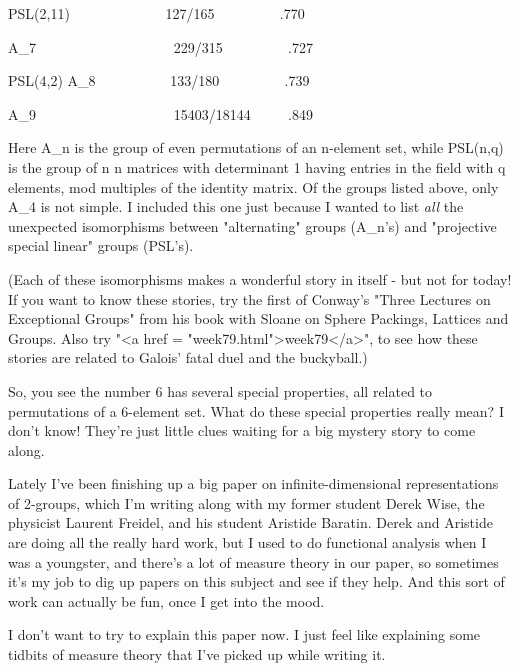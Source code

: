 PSL(2,11)      
\   \   \   \   \   \   \   
\   \   \   \   \   \                 
 127/165
\   \   \   \   \   \                 
\      ~ .770

A_{7} 
\   \   \  \   \   \   \   \   \   
\   \   \   \   \   
\   \   \   \   \   
                           229/315   
\   \   \   \   \  \   \   
    ~ .727 

PSL(4,2) \cong  A_{8}          
\   \   \  \   \   \   \   \   \   
\   
                   133/180   
\   \   \   \   \              
\   \   
  ~ .739

A_{9}
\   \   \   \   \   
\   \   \  
\   \   \  
\   \   \  
\   \   \  
\   \  
                15403/18144 
\   \    \                 
~ .849

Here A_{n} is the group of even permutations of an n-element set,
while PSL(n,q) is the group of n \times  n matrices with determinant 1
having entries in the field with q elements, mod multiples of the identity
matrix.  Of the groups listed above, only A_{4} is not simple.  I
included this one just because I wanted to list \emph{all} the unexpected
isomorphisms between "alternating" groups (A_{n}'s) and "projective
special linear" groups (PSL's).

(Each of these isomorphisms makes a wonderful story in 
itself - but not for today!  If you want to know these stories, 
try the first of Conway's "Three Lectures on Exceptional Groups" from his 
book with Sloane on Sphere Packings, Lattices and Groups.  Also try 
"<a href = "week79.html">week79</a>", to see how these stories
are related to Galois' fatal duel and the buckyball.) 

So, you see the number 6 has several special properties, all related to
permutations of a 6-element set.  What do these special properties
really mean?  I don't know!  They're just little clues waiting for a
big mystery story to come along.

Lately I've been finishing up a big paper on infinite-dimensional
representations of 2-groups, which I'm writing along with my former
student Derek Wise, the physicist Laurent Freidel, and his student
Aristide Baratin.  Derek and Aristide are doing all the really hard
work, but I used to do functional analysis when I was a youngster, 
and there's a lot of measure theory in our paper, so sometimes it's 
my job to dig up papers on this subject and see if they help.  And 
this sort of work can actually be fun, once I get into the mood.

I don't want to try to explain this paper now.  I just feel like
explaining some tidbits of measure theory that I've picked up while
writing it.

